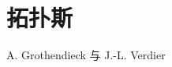 \setcounter{chapter}{3}
\chapter{拓扑斯}
\begin{center}
A. Grothendieck 与 J.-L. Verdier
\end{center}
\label{sga4.exp.IV}



